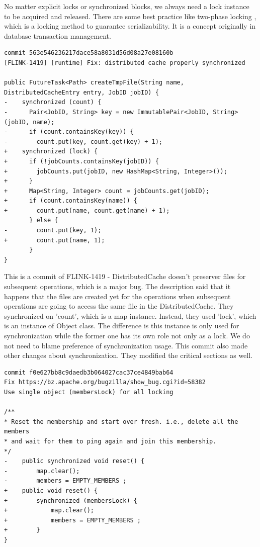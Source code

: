 \documentclass[conference]{IEEEtran}
\begin{document}
No matter explicit locks or synchronized blocks, we always need a lock instance to be acquired and released.  There are some best practice like two-phase locking \cite{journals/cacm/EswarranGLT76}, which is a locking method to guarantee serializability. It is a concept originally in database transaction management. %

\begin{lstlisting}
commit 563e546236217dace58a8031d56d08a27e08160b
[FLINK-1419] [runtime] Fix: distributed cache properly synchronized

public FutureTask<Path> createTmpFile(String name, DistributedCacheEntry entry, JobID jobID) {
-    synchronized (count) {
-      Pair<JobID, String> key = new ImmutablePair<JobID, String>(jobID, name);
-      if (count.containsKey(key)) {
-        count.put(key, count.get(key) + 1);
+    synchronized (lock) {
+      if (!jobCounts.containsKey(jobID)) {
+        jobCounts.put(jobID, new HashMap<String, Integer>());
+      }
+      Map<String, Integer> count = jobCounts.get(jobID);
+      if (count.containsKey(name)) {
+        count.put(name, count.get(name) + 1);
       } else {
-        count.put(key, 1);
+        count.put(name, 1);
       }
}
\end{lstlisting}

This is a commit of FLINK-1419 - DistributedCache doesn't preserver files for subsequent operations, which is a major bug. The description said that it happens that the files are created yet for the operations when subsequent operations are going to access the same file in the DistributedCache. They synchronized on 'count', which is a map instance. Instead, they used 'lock', which is an instance of Object class. The difference is this instance is only used for synchronization while the former one has its own role not only as a lock. We do not need to blame preference of synchronization usage. This commit also made other changes about synchronization. They modified the critical sections as well.

\begin{lstlisting}
commit f0e627bb8c9daedb3b064027cac37ce4849bab64
Fix https://bz.apache.org/bugzilla/show_bug.cgi?id=58382
Use single object (membersLock) for all locking

/**
* Reset the membership and start over fresh. i.e., delete all the members
* and wait for them to ping again and join this membership.
*/
-    public synchronized void reset() {
-        map.clear();
-        members = EMPTY_MEMBERS ;
+    public void reset() {
+        synchronized (membersLock) {
+            map.clear();
+            members = EMPTY_MEMBERS ;
+        }
}
\end{lstlisting}
\end{document}
